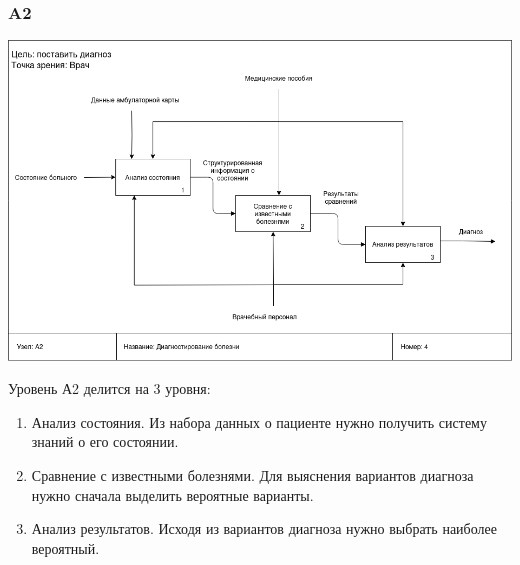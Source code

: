\documentclass[a4paper, 12pt]{article}
\begin{document}
\subsubsection{A2}
\begin{center}
  \centering
  \includegraphics[width=1\linewidth]{extra/as-is_A2.png}
  \label{fig:prplot}
\end{center}
Уровень А2 делится на 3 уровня:
\begin{enumerate}
  \item Анализ состояния. Из набора данных о пациенте нужно получить систему знаний о его состоянии.
  \item Сравнение с известными болезнями. Для выяснения вариантов диагноза нужно сначала выделить вероятные варианты.
  \item Анализ результатов. Исходя из вариантов диагноза нужно выбрать наиболее вероятный.
\end{enumerate}
\end{document}
